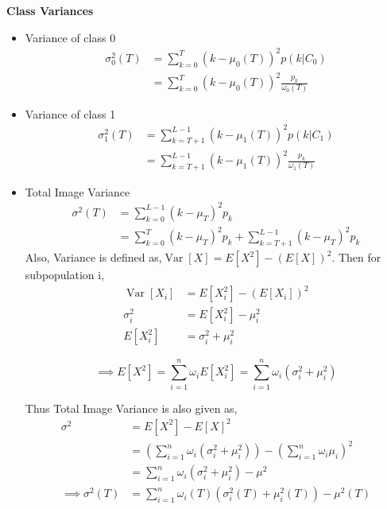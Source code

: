 \noindent \textbf{Class Variances}\\
\begin{itemize}
\item Variance of class 0
\begin{align*}
\sigma_0^2(T) &= \sum_{k=0}^{T} (k - \mu_0(T))^2 p(k | C_0)\\
&= \sum_{k=0}^{T} (k - \mu_0(T))^2 \frac{p_k}{\omega_0(T)}
\end{align*}

\item Variance of class 1
\begin{align*}
\sigma_1^2(T) &= \sum_{k=T+1}^{L-1} (k - \mu_1(T))^2 p(k | C_1)\\
&= \sum_{k=T+1}^{L-1} (k - \mu_1(T))^2 \frac{p_k}{\omega_1(T)}
\end{align*}

\item Total Image Variance
\begin{align*}
  \sigma^2 (T) &= \sum_{k=0}^{L-1} (k - \mu_T)^2 p_k \\
  &= \sum_{k=0}^{T} (k - \mu_T)^2 p_k + \sum_{k=T+1}^{L-1} (k - \mu_T)^2 p_k
\end{align*}
Also, Variance is defined as,$ \operatorname{Var}[X] = E[X^2] - (E[X])^2$. Then for subpopulation i,
\begin{align*}
  \operatorname{Var}[X_i] &= E[X_i^2] - (E[X_i])^2\\
  \sigma_i^2 &= E[X_i^2] - \mu_i^2\\
  E[X_i^2] &= \sigma_i^2 + \mu_i^2 
\end{align*}

$$
\implies E[X^2] = \sum_{i=1}^n \omega_i E[X_i^2] = \sum_{i=1}^n \omega_i(\sigma_i^2 + \mu_i^2)
$$

Thus Total Image Variance is also given as,
\begin{align*}
\sigma^2 &= E[X^2] - E[X]^2\\ 
&= \left( \sum_{i=1}^n \omega_i(\sigma_i^2 + \mu_i^2) \right) - \left(\sum_{i=1}^n \omega_i \mu_i \right)^2\\
&= \sum_{i=1}^n \omega_i \left( \sigma_i^2 + \mu_i^2 \right) - \mu^2\\
\implies \sigma^2(T) &= \sum_{i=1}^n \omega_i(T) \left( \sigma_i^2 (T)+ \mu_i^2(T) \right) - \mu^2 (T)
\end{align*}
\end{itemize}




